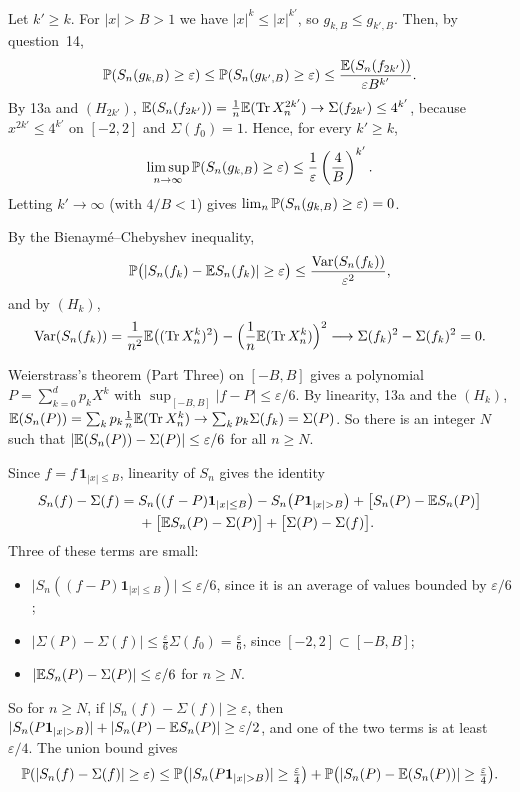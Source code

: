 \documentclass[11pt,a4paper]{article}
\begin{document}
Let $k'\ge k$. For $|x|>B>1$ we have $|x|^k\le|x|^{k'}$, so $g_{k,B}\le g_{k',B}$. Then, by
question~14,
\[
  \mathbb{P}(S_n(g_{k,B})\ge\varepsilon)\le\mathbb{P}(S_n(g_{k',B})\ge\varepsilon)
  \le\frac{\mathbb{E}(S_n(f_{2k'}))}{\varepsilon B^{k'}} .
\]
By 13a and $(H_{2k'})$, $\mathbb{E}(S_n(f_{2k'})) = \frac1n\mathbb{E}(\operatorname{Tr} X_n^{2k'})\to\Sigma(f_{2k'})\le4^{k'}$,
because $x^{2k'}\le4^{k'}$ on $[-2,2]$ and $\Sigma(f_0) = 1$. Hence, for every $k'\ge k$,
\[
  \limsup_{n\to\infty}\mathbb{P}(S_n(g_{k,B})\ge\varepsilon)\le\frac1\varepsilon\left(\frac4B\right)^{k'}.
\]
Letting $k'\to\infty$ (with $4/B<1$) gives $\lim_n\mathbb{P}(S_n(g_{k,B})\ge\varepsilon) = 0$.

By the Bienaymé--Chebyshev inequality,
\[
  \mathbb{P}\bigl(|S_n(f_k)-\mathbb{E} S_n(f_k)|\ge\varepsilon\bigr)\le\frac{\mathrm{Var}(S_n(f_k))}{\varepsilon^2},
\]
and by $(H_k)$,
\[
  \mathrm{Var}(S_n(f_k)) = \frac1{n^2}\mathbb{E}\bigl((\operatorname{Tr} X_n^k)^2\bigr) - \Bigl(\frac1n\mathbb{E}(\operatorname{Tr} X_n^k)\Bigr)^2
  \longrightarrow \Sigma(f_k)^2 - \Sigma(f_k)^2 = 0 .
\]

Weierstrass's theorem (Part Three) on $[-B,B]$ gives a polynomial
$P = \sum_{k=0}^dp_kX^k$ with $\sup_{[-B,B]}|f-P|\le\varepsilon/6$. By linearity, 13a and the
$(H_k)$, $\mathbb{E}(S_n(P)) = \sum_kp_k\frac1n\mathbb{E}(\operatorname{Tr} X_n^k)\to\sum_kp_k\Sigma(f_k) = \Sigma(P)$. So
there is an integer $N$ such that $|\mathbb{E}(S_n(P))-\Sigma(P)|\le\varepsilon/6$ for all $n\ge N$.

Since $f = f\,\mathbf1_{|x|\le B}$, linearity of $S_n$ gives the identity
\begin{align*}
  S_n(f)-\Sigma(f) = {}& S_n\bigl((f-P)\mathbf1_{|x|\le B}\bigr) - S_n\bigl(P\mathbf1_{|x|>B}\bigr)
  + \bigl[S_n(P)-\E S_n(P)\bigr]\\
  &+ \bigl[\E S_n(P)-\Sigma(P)\bigr] + \bigl[\Sigma(P)-\Sigma(f)\bigr].
\end{align*}
Three of these terms are small:
\begin{itemize}
\item $\bigl|S_n((f-P)\mathbf1_{|x|\le B})\bigr|\le\varepsilon/6$, since it is an average of
  values bounded by $\varepsilon/6$;
\item $|\Sigma(P)-\Sigma(f)|\le\frac\varepsilon6\Sigma(f_0) = \frac\varepsilon6$, since
  $[-2,2]\subset[-B,B]$;
\item $|\mathbb{E} S_n(P)-\Sigma(P)|\le\varepsilon/6$ for $n\ge N$.
\end{itemize}
So for $n\ge N$, if $|S_n(f)-\Sigma(f)|\ge\varepsilon$, then
$|S_n(P\mathbf1_{|x|>B})| + |S_n(P)-\E S_n(P)|\ge\varepsilon/2$, and one of the two terms is at
least $\varepsilon/4$. The union bound gives
\[
  \PP(|S_n(f)-\Sigma(f)|\ge\varepsilon)\le\PP\bigl(|S_n(P\mathbf1_{|x|>B})|\ge\tfrac\varepsilon4\bigr)
  + \PP\bigl(|S_n(P)-\E(S_n(P))|\ge\tfrac\varepsilon4\bigr).
\]
\end{document}
